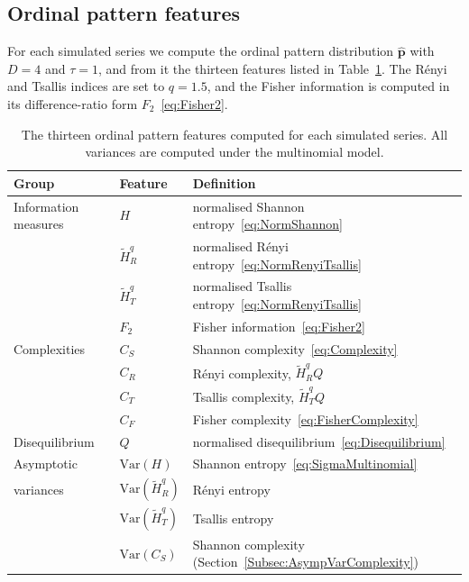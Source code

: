 \subsection{Ordinal pattern features}\label{Subsec:SimFeatures}

For each simulated series we compute the ordinal pattern distribution $\widehat{\mathbf{p}}$ with $D=4$ and $\tau=1$, and from it the thirteen features listed in Table~\ref{tab:SimFeatures}. The Rényi and Tsallis indices are set to $q=1.5$, and the Fisher information is computed in its difference-ratio form $F_2$~\eqref{eq:Fisher2}.

\begin{table}[H]
	\centering
	\small
	\begin{tabular}{lll}
		\toprule
		Group & Feature & Definition \\
		\midrule
		Information measures & $H$ & normalised Shannon entropy~\eqref{eq:NormShannon} \\
		& $\widetilde{H}_{R}^{q}$ & normalised Rényi entropy~\eqref{eq:NormRenyiTsallis} \\
		& $\widetilde{H}_{T}^{q}$ & normalised Tsallis entropy~\eqref{eq:NormRenyiTsallis} \\
		& $F_2$ & Fisher information~\eqref{eq:Fisher2} \\
		\midrule
		Complexities & $C_S$ & Shannon complexity~\eqref{eq:Complexity} \\
		& $C_R$ & Rényi complexity, $\widetilde{H}_{R}^{q}Q$ \\
		& $C_T$ & Tsallis complexity, $\widetilde{H}_{T}^{q}Q$ \\
		& $C_F$ & Fisher complexity~\eqref{eq:FisherComplexity} \\
		\midrule
		Disequilibrium & $Q$ & normalised disequilibrium~\eqref{eq:Disequilibrium} \\
		\midrule
		Asymptotic & $\mathrm{Var}(H)$ & Shannon entropy~\eqref{eq:SigmaMultinomial} \\
		variances & $\mathrm{Var}(\widetilde{H}_{R}^{q})$ & Rényi entropy~\cite{Rey2024} \\
		& $\mathrm{Var}(\widetilde{H}_{T}^{q})$ & Tsallis entropy~\cite{Rey2024} \\
		& $\mathrm{Var}(C_S)$ & Shannon complexity (Section~\ref{Subsec:AsympVarComplexity}) \\
		\bottomrule
	\end{tabular}
	\caption{The thirteen ordinal pattern features computed for each simulated series. All variances are computed under the multinomial model.}
	\label{tab:SimFeatures}
\end{table}

